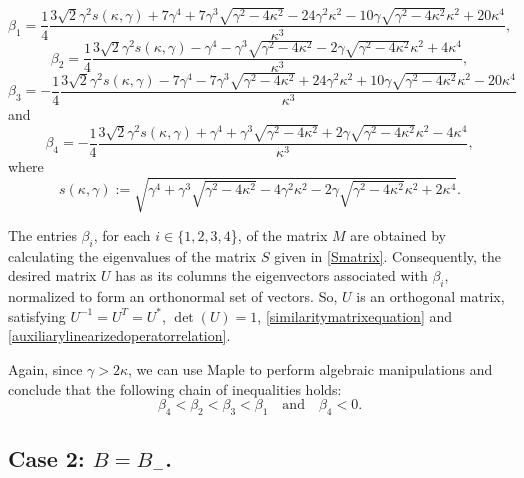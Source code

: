 \documentclass[10pt,reqno,a4paper]{amsart} %
\theoremstyle{definition} %
\numberwithin{equation}{section}
\numberwithin{figure}{section}
\begin{document}
\begin{equation}\label{beta1GeneralB+}
\beta_1 = \frac{1}{4} \frac{3\sqrt{2}\gamma^2 s(\kappa, \gamma) + 7\gamma^4 + 7\gamma^3\sqrt{\gamma^2 - 4\kappa^2} - 24\gamma^2\kappa^2 - 10\gamma\sqrt{\gamma^2 - 4\kappa^2}\kappa^2 + 20\kappa^4}{\kappa^3},
\end{equation}
\begin{equation}\label{beta2GeneralB+}
\beta_2 = \frac{1}{4} \frac{3\sqrt{2}\gamma^2 s(\kappa, \gamma) - \gamma^4 - \gamma^3\sqrt{\gamma^2 - 4\kappa^2} - 2\gamma\sqrt{\gamma^2 - 4\kappa^2}\kappa^2 + 4\kappa^4}{\kappa^3},
\end{equation}
\begin{equation}\label{beta3GeneralB+}
\beta_3 = -\frac{1}{4} \frac{3\sqrt{2}\gamma^2 s(\kappa, \gamma) - 7\gamma^4 - 7\gamma^3\sqrt{\gamma^2 - 4\kappa^2} + 24\gamma^2\kappa^2 + 10\gamma\sqrt{\gamma^2 - 4\kappa^2}\kappa^2 - 20\kappa^4}{\kappa^3}
\end{equation}
and
\begin{equation}\label{beta4GeneralB+}
\beta_4 = -\frac{1}{4} \frac{3\sqrt{2}\gamma^2 s(\kappa, \gamma) + \gamma^4 + \gamma^3\sqrt{\gamma^2 - 4\kappa^2} + 2\gamma\sqrt{\gamma^2 - 4\kappa^2}\kappa^2 - 4\kappa^4}{\kappa^3},
\end{equation}
where
\begin{equation}\label{skappagamma}
s(\kappa, \gamma) := \sqrt{\gamma^4 + \gamma^3\sqrt{\gamma^2 - 4\kappa^2} - 4\gamma^2\kappa^2 - 2\gamma\sqrt{\gamma^2 - 4\kappa^2}\kappa^2 + 2\kappa^4}.
\end{equation}

The entries $\beta_i$, for each $i \in \{1,2,3,4$\}, of the matrix $M$ are obtained by calculating the eigenvalues of the matrix $S$ given in \eqref{Smatrix}. Consequently, the desired matrix $U$ has as its columns the eigenvectors associated with $\beta_i$, normalized to form an orthonormal set of vectors. So, $U$ is an orthogonal matrix, satisfying $U^{-1} = U^T = U^*$, $\det(U) = 1$, \eqref{similaritymatrixequation} and \eqref{auxiliarylinearizedoperatorrelation}.

Again, since $\gamma > 2\kappa$, we can use Maple to perform algebraic manipulations and conclude that the following chain of inequalities holds:
\begin{equation}\label{betainequalities}
    \beta_4 < \beta_2 < \beta_3 < \beta_1 \quad \text{and} \quad \beta_4 < 0.
\end{equation}

\subsection*{Case 2: $B = B_-$.}
\end{document}
